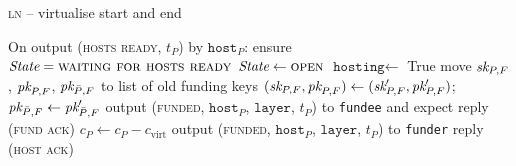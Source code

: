 \begin{center}
\begin{processbox}{\textsc{ln} -- virtualise start and end}
\begin{algorithmic}[1]
      \State On output (\textsc{hosts ready}, $t_P$) by $\texttt{host}_P$:
      \label{code:ln:virtualise:start-end:hosts-ready}
      \Indent
        \State ensure $\itistate = \textsc{waiting for hosts ready}$
        \State $\itistate \gets \textsc{open}$
        \State $\texttt{hosting} \gets$ True
        \State move $\textit{sk}_{P, F}$, $\textit{pk}_{P, F}$, $\textit{pk}_{\bar{P}, F}$ to list of old
        funding keys
        \State $(\textit{sk}_{P, F}, \textit{pk}_{P, F}) \gets (\textit{sk}_{P, F}', \textit{pk}_{P, F}')$;
        $\textit{pk}_{\bar{P}, F} \gets \textit{pk}_{\bar{P}, F}'$
         
          \State output (\textsc{funded}, $\texttt{host}_P$, $\texttt{layer}$,
          $t_P$) to \texttt{fundee} and expect reply (\textsc{fund ack})
          \label{code:ln:virtualise:start-end:helper-output-funded}
         
          \State $c_P \gets c_P - c_{\mathrm{virt}}$
          \label{code:ln:virtualise:start-end:reduce-coins}
          \State output (\textsc{funded}, $\texttt{host}_P$, $\texttt{layer}$,
          $t_P$) to \texttt{funder} 
          \label{code:ln:virtualise:start-end:funder-funded}
        \EndIf
        \State reply (\textsc{host ack})
        \label{code:ln:virtualise:start-end:reply}
      \EndIndent
    \end{algorithmic}
  \end{processbox}
  \label{code:ln:virtualise:start-end}
\end{center} \ \\

